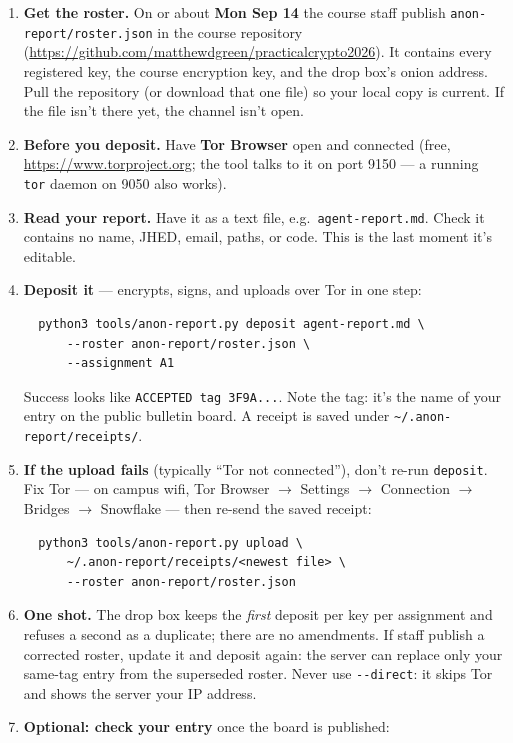 \documentclass[11pt]{article}
\newcommand{\code}[1]{\texttt{#1}}
\newcommand{\file}[1]{\texttt{#1}}
\begin{document}
\medskip \noindent
\begin{enumerate}
\item \textbf{Get the roster.} On or about \textbf{Mon Sep 14} the course staff publish
  \file{anon-report/roster.json} in the course repository
  (\url{https://github.com/matthewdgreen/practicalcrypto2026}). It contains every
  registered key, the course encryption key, and the drop box's onion address. Pull the
  repository (or download that one file) so your local copy is current. If the file isn't
  there yet, the channel isn't open.
\item \textbf{Before you deposit.} Have \textbf{Tor Browser} open and connected (free,
  \url{https://www.torproject.org}; the tool talks to it on port 9150 --- a running
  \code{tor} daemon on 9050 also works).
\item \textbf{Read your report.} Have it as a text file, e.g.\ \file{agent-report.md}.
  Check it contains no name, JHED, email, paths, or code. This is the last moment it's
  editable.
\item \textbf{Deposit it} --- encrypts, signs, and uploads over Tor in one step:
\begin{verbatim}
  python3 tools/anon-report.py deposit agent-report.md \
      --roster anon-report/roster.json \
      --assignment A1
\end{verbatim}
  Success looks like \code{ACCEPTED   tag 3F9A...}. Note the tag: it's the name of
  your entry on the public bulletin board. A receipt is saved under
  \file{\textasciitilde/.anon-report/receipts/}.
\item \textbf{If the upload fails} (typically ``Tor not connected''), don't re-run
  \code{deposit}. Fix Tor --- on campus wifi, Tor Browser $\to$ Settings $\to$ Connection
  $\to$ Bridges $\to$ Snowflake --- then re-send the saved receipt:
\begin{verbatim}
  python3 tools/anon-report.py upload \
      ~/.anon-report/receipts/<newest file> \
      --roster anon-report/roster.json
\end{verbatim}
\item \textbf{One shot.} The drop box keeps the \emph{first} deposit per key per
  assignment and refuses a second as a duplicate; there are no amendments. If staff
  publish a corrected roster, update it and deposit again: the server can replace only
  your same-tag entry from the superseded roster. Never use \code{-{}-direct}: it skips
  Tor and shows the server your IP address.
\item \textbf{Optional: check your entry} once the board is published:

\end{enumerate}
\end{document}
